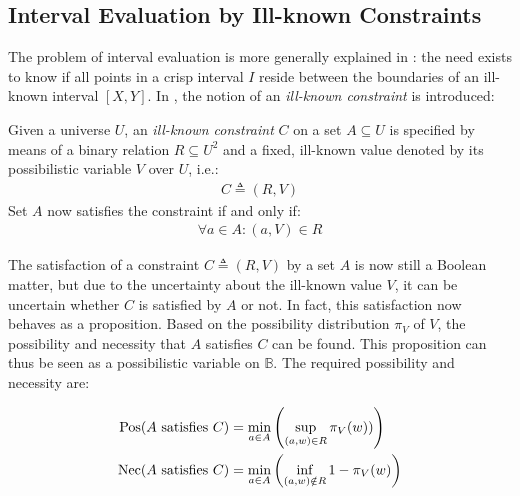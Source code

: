 %  



\subsection{Interval Evaluation by Ill-known Constraints}
The problem of interval evaluation is more generally explained in \cite{Pon11}: the need exists to know if all points in a crisp interval $I$ reside between the boundaries of an ill-known interval $\left[ X , Y \right]$. In \cite{Pon11}, the notion of an \emph{ill-known constraint} is introduced:

\begin{definition}
Given a universe $U$, an \emph{ill-known constraint} $C$ on a set $A \subseteq U$ is specified by means of a binary relation $R \subseteq U^{2}$ and a fixed, ill-known value denoted by its possibilistic variable $V$ over $U$, i.e.:
\begin{align}
C \triangleq (R,V)
\end{align}
Set $A$ now satisfies the constraint if and only if:
\begin{align}
\forall a \in A : (a,V) \in R
\end{align}
\end{definition}

The satisfaction of a constraint $C \triangleq (R,V)$ by a set $A$ is now still a Boolean matter, but due to the uncertainty about the ill-known value $V$, it can be uncertain whether $C$ is satisfied by $A$ or not\cite{Pon11}. In fact, this satisfaction now behaves as a proposition. Based on the possibility distribution $\pi_{V}$ of $V$, the possibility and necessity that $A$ satisfies $C$ can be found. This proposition can thus be seen as a possibilistic variable on $\mathbb{B}$. The required possibility and necessity are:

\vspace{-10pt}

\begin{align}
\operatorname{Pos}(A\text{ satisfies }C) & = \min_{a \in A}\left(\sup_{(a,w) \in R}\pi_{V}(w))\right) \label{ill-known-pos}\\
\operatorname{Nec}(A\text{ satisfies }C) & = \min_{a \in A}\left(\inf_{(a,w) \notin R} 1-\pi_{V}(w)\right) \label{ill-known-nec}
\end{align}

